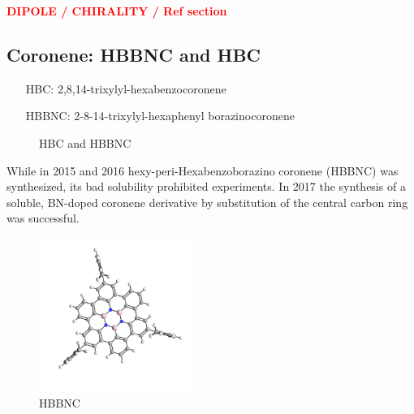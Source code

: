 \textcolor{red}{\textbf{DIPOLE / CHIRALITY / Ref section}}
\subsection{Coronene: HBBNC and HBC}
\label{sec:hbc}
\begin{itemize}
	\item[HBC:] 2,8,14-trixylyl-hexabenzocoronene	
	\item[HBBNC:] 2-8-14-trixylyl-hexaphenyl borazinocoronene
\end{itemize}

\begin{figure}[h!]\centering
{} \quad
{}
	\caption{ HBC and  HBBNC}
	\label{fig:HBBNC+HBC}
\end{figure}

While in 2015\cite{Krieg_construction_2015} and 2016 \cite{Ciccullo_Quasi-Free-Standing_2016} hexy-peri-Hexabenzoborazino coronene (HBBNC) was synthesized, its bad solubility prohibited experiments. In 2017 the synthesis \cite{dosso_synthesis_2017} of a soluble, BN-doped coronene derivative by substitution of the central carbon ring was successful. 
\begin{figure}\centering
	\includegraphics[angle=90,width=5cm]{./images/molecules/max-zoom/HBBNC-600}
	\caption{HBBNC}
	\label{fig:HBBNC-molecule}
\end{figure}

